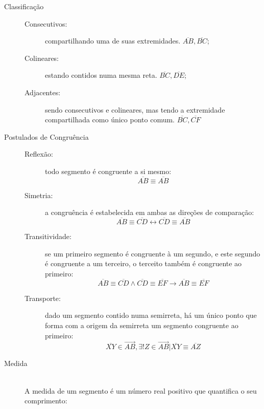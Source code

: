 \begin{description}
\begin{center}
                \end{center}
            \item[Classificação] \hfill
                \begin{description}
                    \item[Consecutivos:] compartilhando uma de suas extremidades. \eg \hfill $\overline{AB},\overline{BC}$;
                    \item[Colineares:] estando contidos numa mesma reta. \eg \hfill $\overline{BC}, \overline{DE}$;
                    \item[Adjacentes:] sendo consecutivos e colineares, mas tendo a extremidade compartilhada como único ponto comum. \eg \hfill $\overline{BC}, \overline{CF}$
                \end{description}
            \item[Postulados de Congruência] \hfill
                \begin{description}
                    \item[Reflexão:] todo segmento é congruente a si mesmo: \[ \overline{AB} \equiv \overline{AB} \]
                    \item[Simetria:] a congruência é estabelecida em ambas as direções de comparação: \[ \overline{AB} \equiv \overline{CD} \leftrightarrow \overline{CD} \equiv \overline{AB} \]
                    \item[Transitividade:] se um primeiro segmento é congruente à um segundo, e este segundo é congruente a um terceiro, o terceito também é congruente ao primeiro: \[ \overline{AB} \equiv \overline{CD} \wedge \overline{CD} \equiv \overline{EF} \rightarrow \overline{AB} \equiv \overline{EF} \]
                    \item[Transporte:] dado um segmento contido numa semirreta, há um único ponto que forma com a origem da semirreta um segmento congruente ao primeiro: \[ \overline{XY} \in \overrightarrow{AB}, \exists ! Z \in \overrightarrow{AB} | \overline{XY} \equiv \overline{AZ} \]
                \end{description}
            \item[Medida] \hfill \\
                A medida de um segmento é um número real positivo que quantifica o seu comprimento:

\end{description}
